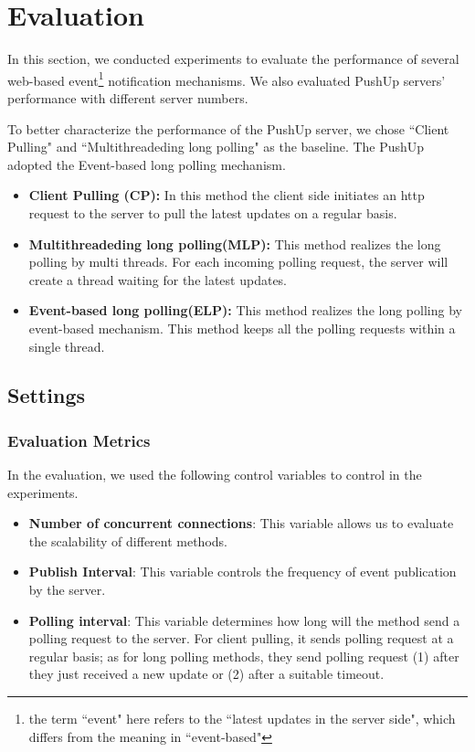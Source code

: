 \section {Evaluation\\}
 
In this section, we conducted experiments to evaluate the performance of 
several web-based event\footnote{the term ``event" here refers to the ``latest 
updates in the server side", which differs from the meaning in ``event-based"
} notification mechanisms. We also evaluated PushUp servers' performance with
different server numbers.

To better characterize the performance of the PushUp server, we chose ``Client
Pulling" and ``Multithreadeding long polling" as the baseline. The PushUp
adopted the Event-based long polling mechanism.

\begin{itemize}
    \item {\bf Client Pulling (CP): } In this method the client side initiates 
        an http request to the server to pull the latest updates on a regular 
        basis.
    \item {\bf Multithreadeding long polling(MLP): } This method realizes the 
        long polling by multi threads. For each incoming polling request, the
        server will create a thread waiting for the latest updates.
    \item {\bf Event-based long polling(ELP): } This method realizes the long
        polling by event-based mechanism. This method keeps all the polling 
        requests within a single thread.
\end{itemize}

\subsection{Settings \\}

\subsubsection{Evaluation Metrics \\}
In the evaluation, we used the following control variables to control in
the experiments.

\begin{itemize}
    \item {\bf Number of concurrent connections}: This variable allows us 
         to evaluate the scalability of different methods.
    \item {\bf Publish Interval}: This variable controls the frequency of 
         event publication by the server. 
    \item {\bf Polling interval}: This variable determines how long will 
        the method send a polling request to the server. For client 
        pulling, it sends polling request at a regular basis; as for
        long polling methods, they send polling request (1) after they
        just received a new update or (2) after a suitable timeout.
\end{itemize}

